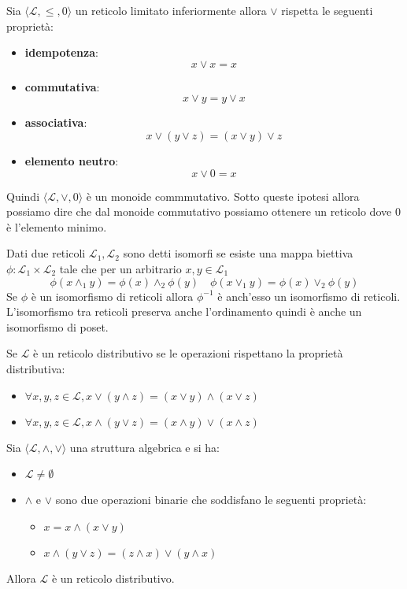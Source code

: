 \begin{teorema}
    Sia $\langle \mathcal{L}, \le, 0\rangle$ un reticolo limitato inferiormente allora 
    $\lor$ rispetta le seguenti proprietà:
    \begin{itemize}
        \item \textbf{idempotenza}:
        $$ x\lor x = x$$ 
        \item \textbf{commutativa}:
        $$x\lor y = y\lor x$$ 
        \item \textbf{associativa}:
        $$x\lor (y \lor z) =( x\lor y)\lor z$$ 
        \item \textbf{elemento neutro}:
        $$x\lor 0 =x$$  
    \end{itemize}
    Quindi $\langle \mathcal{L}, \lor, 0\rangle$ è un monoide commmutativo. Sotto queste 
    ipotesi allora possiamo dire che dal monoide commutativo possiamo ottenere un 
    reticolo dove $0$ è l'elemento minimo.
\end{teorema}

\begin{definizione}
    Dati due reticoli $\mathcal{L}_1, \mathcal{L_2}$ sono detti isomorfi se esiste 
    una mappa biettiva $\phi:\mathcal{L}_1\times \mathcal{L}_2$ tale che 
    per un arbitrario $x,y\in \mathcal{L}_1$
    $$\phi(x\land_1 y) = \phi(x)\land_2\phi(y) \quad \phi(x\lor_1 y) = \phi(x)\lor_2\phi(y)$$
    Se $\phi$ è un isomorfismo di reticoli allora $\phi^{-1}$ è anch'esso un isomorfismo
    di reticoli. L'isomorfismo tra reticoli preserva anche l'ordinamento quindi è anche 
    un isomorfismo di poset.
\end{definizione}

\begin{definizione}
    Se $\mathcal{L}$ è un reticolo distributivo se le operazioni rispettano la proprietà
    distributiva:
    \begin{itemize}
        \item $\forall x,y,z\in \mathcal{L}, x\lor (y\land z)= (x\lor y) \land (x\lor z)$
        \item $\forall x,y,z\in \mathcal{L}, x\land (y\lor z)= (x\land y) \lor (x\land z)$
    \end{itemize}
\end{definizione}

\begin{teorema}
    Sia $\langle \mathcal{L}, \land, \lor \rangle$ una struttura algebrica e si ha:
    \begin{itemize}
        \item $\mathcal{L}\ne \emptyset$
        \item $\land$ e $\lor$ sono due operazioni binarie che soddisfano le seguenti 
        proprietà:
        \begin{itemize}
            \item $x=x\land(x\lor y)$
            \item $x\land (y\lor z) = (z\land x) \lor (y\land x)$
        \end{itemize}
    \end{itemize}
    Allora $\mathcal{L}$ è un reticolo distributivo.
\end{teorema}


